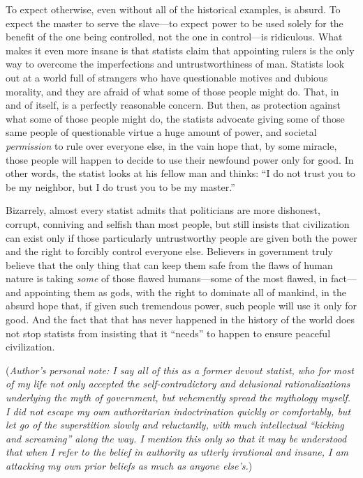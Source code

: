 \documentclass{book}
\begin{document}
To expect otherwise, even without all of the historical examples, is absurd. To expect the master to serve the slave---to expect power to be used solely for the benefit of the one being controlled, not the one in control---is ridiculous. What makes it even more insane is that statists claim that appointing rulers is the only way to overcome the imperfections and untrustworthiness of man. Statists look out at a world full of strangers who have questionable motives and dubious morality, and they are afraid of what some of those people might do. That, in and of itself, is a perfectly reasonable concern. But then, as protection against what some of those people might do, the statists advocate giving some of those same people of questionable virtue a huge amount of power, and societal \emph{permission} to rule over everyone else, in the vain hope that, by some miracle, those people will happen to decide to use their newfound power only for good. In other words, the statist looks at his fellow man and thinks: \enquote{I do not trust you to be my neighbor, but I do trust you to be my master.}

Bizarrely, almost every statist admits that politicians are more dishonest, corrupt, conniving and selfish than most people, but still insists that civilization can exist only if those particularly untrustworthy people are given both the power and the right to forcibly control everyone else. Believers in government truly believe that the only thing that can keep them safe from the flaws of human nature is taking \emph{some} of those flawed humans---some of the most flawed, in fact---and appointing them as gods, with the right to dominate all of mankind, in the absurd hope that, if given such tremendous power, such people will use it only for good. And the fact that that has never happened in the history of the world does not stop statists from insisting that it \enquote{needs} to happen to ensure peaceful civilization.

(\emph{Author's personal note: I say all of this as a former devout statist, who for most of my life not only accepted the self-contradictory and delusional rationalizations underlying the myth of government, but vehemently spread the mythology myself. I did not escape my own authoritarian indoctrination quickly or comfortably, but let go of the superstition slowly and reluctantly, with much intellectual \enquote{kicking and screaming} along the way. I mention this only so that it may be understood that when I refer to the belief in authority as utterly irrational and insane, I am attacking my own prior beliefs as much as anyone else's.})
\end{document}
